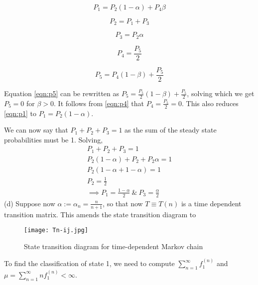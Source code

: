 \begin{equation}\label{eqn:p1}
P_1 = P_2(1-\alpha) + P_4\beta
\end{equation}

\begin{equation}\label{eqn:p2}
P_2 = P_1 + P_3
\end{equation}

\begin{equation}\label{eqn:p3}
P_3 = P_2\alpha
\end{equation}

\begin{equation}\label{eqn:p4}
P_4 = \frac{P_5}{2}
\end{equation}

\begin{equation}\label{eqn:p5}
P_5 = P_4(1-\beta)+\frac{P_5}{2}
\end{equation}

Equation \ref{eqn:p5} can be rewritten as $P_5 = \frac{P_5}{2}(1-\beta) + \frac{P_5}{2}$, solving which we get $P_5=0$ for $\beta>0$. It follows from \ref{eqn:p4} that $P_4=\frac{P_5}{2} = 0$. This also reduces \ref{eqn:p1} to $P_1 = P_2(1-\alpha)$.

We can now say that $P_1 + P_2 + P_3=1$ as the sum of the steady state probabilities must be 1. Solving,
\begin{gather*}
P_1 + P_2 + P_3 = 1\\
P_2(1-\alpha) + P_2 + P_2\alpha = 1\\
P_2(1 - \alpha + 1 - \alpha) = 1\\
P_2 = \frac{1}{2}\\
\implies P_1 = \frac{1-\alpha}{2} \ \& \ P_3 = \frac{\alpha}{2}
\end{gather*}
(d)  Suppose now $\alpha := \alpha_n = \frac{n}{n + 1}$, so that now $T \equiv T(n)$ is a time dependent transition
matrix. This amends the state transition diagram to 
\begin{figure}[H]
\centering
\texttt{[image: Tn-ij.jpg]}
\caption{\label{fig:Tn-ij}State transition diagram for time-dependent Markov chain}
\end{figure}
To find the classification of state 1, we need to compute $\sum_{n=1}^{\infty}f_{1}^{(n)}$ and $\mu=\sum_{n=1}^{\infty}nf_{1}^{(n)} < \infty$.

